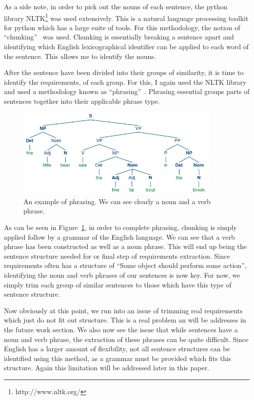 \documentclass[conference]{IEEEtran}
\begin{document}
As a side note, in order to pick out the nouns of each sentence, the python library NLTK\footnote{http://www.nltk.org/}
was used extensively.
This is a natural language processing toolkit for python which has a large suite of tools. For this methodology,
the notion of ``chunking''~\cite{Collobert:2011:NLP} was used. Chunking is essentially breaking a sentence apart and identifying which English
lexicographical identifier can be applied to each word of the sentence. This allows me to identify the nouns.

After the sentence have been divided into their groups of similarity, it is time to identify the requirements,
of each group. For this, I again used the NLTK library and used a methodology known as 
``phrasing''~\cite{Collobert:2011:NLP}. Phrasing
essential groups parts of sentences together into their applicable phrase type.

\begin{figure}[tb!]
\centering
\includegraphics[width=0.9\textwidth]{images/phrase}
\caption{An example of phrasing. We can see clearly a noun and a verb phrase.\label{fig:phrase}}
\end{figure}

As can be seen in Figure~\ref{fig:phrase}, in order to complete phrasing, chunking is simply applied
follow by a grammar of the English language. We can see that a verb phrase has been constructed as well
as a noun phrase. This will end up being the sentence structure needed for or final step of requirements
extraction. Since requirements often has a structure of ``Some object should perform some action'', identifying
the noun and verb phrases of our sentences is now key. For now, we simply trim each group of similar sentences
to those which have this type of sentence structure.

Now obviously at this point, we run into an issue of trimming real requirements which just do not fit out structure.
This is a real problem an will be addresses in the future work section. We also now see the issue that while sentences
have a noun and verb phrase, the extraction of these phrases can be quite difficult. Since English has
a larger amount of flexibility, not all sentence structures can be identified using this method, as a grammar must
be provided which fits this structure. Again this limitation will be addressed later in this paper.
\end{document}
